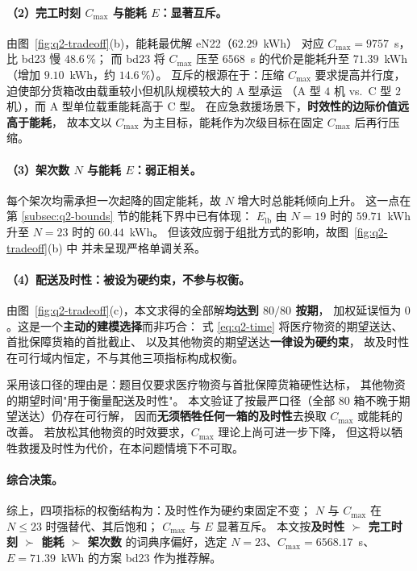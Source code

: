 \paragraph{（2）完工时刻 $C_{\max}$ 与能耗 $E$：显著互斥。}
由图~\ref{fig:q2-tradeoff}(b)，能耗最优解 eN22（$62.29$~kWh）
对应 $C_{\max}=9757$~s，比 bd23 慢 $48.6\,\%$；
而 bd23 将 $C_{\max}$ 压至 $6568$~s 的代价是能耗升至 $71.39$~kWh
（增加 $9.10$~kWh，约 $14.6\,\%$）。
互斥的根源在于：压缩 $C_{\max}$ 要求提高并行度，
迫使部分货箱改由载重较小但机队规模较大的 A 型承运
（A 型 $4$ 机 vs.\ C 型 $2$ 机），而 A 型单位载重能耗高于 C 型。
在应急救援场景下，\textbf{时效性的边际价值远高于能耗}，
故本文以 $C_{\max}$ 为主目标，能耗作为次级目标在固定 $C_{\max}$ 后再行压缩。

\paragraph{（3）架次数 $N$ 与能耗 $E$：弱正相关。}
每个架次均需承担一次起降的固定能耗，故 $N$ 增大时总能耗倾向上升。
这一点在第 \ref{subsec:q2-bounds} 节的能耗下界中已有体现：
$E_{\mathrm{lb}}$ 由 $N=19$ 时的 $59.71$~kWh 升至 $N=23$ 时的 $60.44$~kWh。
但该效应弱于组批方式的影响，故图~\ref{fig:q2-tradeoff}(b) 中
并未呈现严格单调关系。

\paragraph{（4）配送及时性：被设为硬约束，不参与权衡。}
由图~\ref{fig:q2-tradeoff}(c)，本文求得的全部解\textbf{均达到 $80/80$ 按期}，
加权延误恒为 $0$。这是一个\textbf{主动的建模选择}而非巧合：
式 \eqref{eq:q2-time} 将医疗物资的期望送达、首批保障货箱的首批截止、
以及其他物资的期望送达\textbf{一律设为硬约束}，
故及时性在可行域内恒定，不与其他三项指标构成权衡。

采用该口径的理由是：题目仅要求医疗物资与首批保障货箱硬性达标，
其他物资的期望时间"用于衡量配送及时性"。
本文验证了按最严口径（全部 $80$ 箱不晚于期望送达）仍存在可行解，
因而\textbf{无须牺牲任何一箱的及时性}去换取 $C_{\max}$ 或能耗的改善。
若放松其他物资的时效要求，$C_{\max}$ 理论上尚可进一步下降，
但这将以牺牲救援及时性为代价，在本问题情境下不可取。

\paragraph{综合决策。}
综上，四项指标的权衡结构为：及时性作为硬约束固定不变；
$N$ 与 $C_{\max}$ 在 $N\le 23$ 时强替代、其后饱和；
$C_{\max}$ 与 $E$ 显著互斥。
本文按\textbf{及时性 $\succ$ 完工时刻 $\succ$ 能耗 $\succ$ 架次数}
的词典序偏好，选定 $N=23$、$C_{\max}=6568.17$~s、$E=71.39$~kWh
的方案 bd23 作为推荐解。

